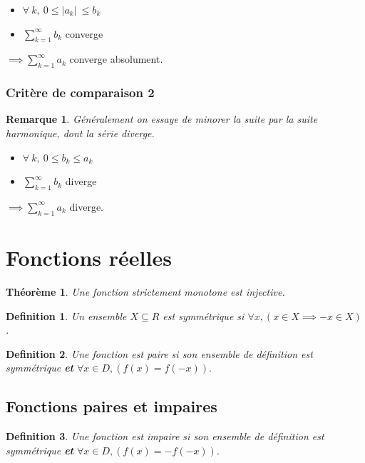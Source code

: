 \documentclass{article}
\newtheorem{definition}{Definition}[section]
\newtheorem{remark}{Remarque}[section]
\newtheorem{theorem}{Théorème}
\begin{document}
\begin{itemize}
    \item $ \forall\ k,\ 0 \leq \lvert a_k \lvert\ \leq b_k $
    \item $ \sum_{k=1}^{\infty} b_k $ converge
\end{itemize}

$ \implies \sum_{k=1}^{\infty} a_k $ converge absolument.

\subsubsection{Critère de comparaison 2}

\begin{remark}
    Généralement on essaye de minorer la suite par la suite harmonique, dont la série diverge.
\end{remark}

\begin{itemize}
    \item $ \forall\ k,\ 0 \leq b_k \leq a_k $
    \item $ \sum_{k=1}^{\infty} b_k $ diverge
\end{itemize}

$ \implies \sum_{k=1}^{\infty} a_k $ diverge.

\section{Fonctions réelles}

\begin{theorem}
    Une fonction strictement monotone est injective.
\end{theorem}

\begin{definition}
    Un ensemble $ X \subseteq R $ est symmétrique si $ \forall x, (x \in X \implies -x \in X) $.
\end{definition}

\begin{definition}
    Une fonction est paire si son ensemble de définition est symmétrique \textbf{et} $ \forall x \in D, (f(x) = f(-x)).$
\end{definition}

\subsection{Fonctions paires et impaires}

\begin{definition}
    Une fonction est impaire si son ensemble de définition est symmétrique \textbf{et} $ \forall x \in D, (f(x) = -f(-x)).$
\end{definition}
\end{document}
